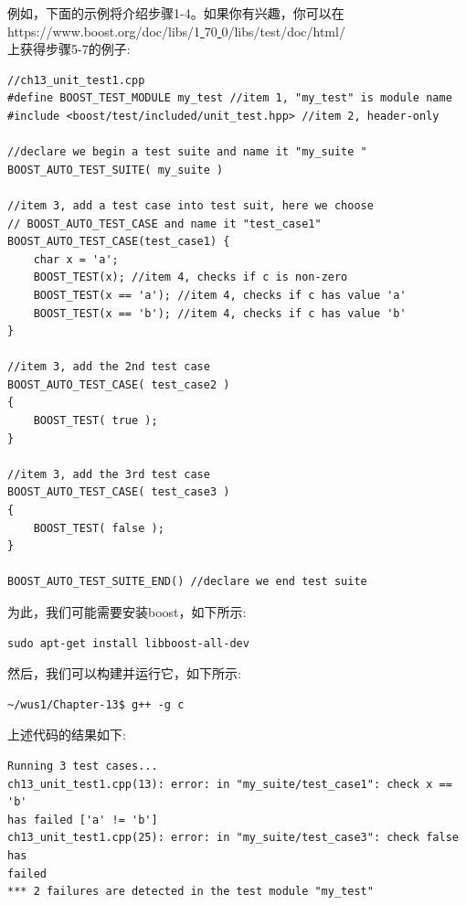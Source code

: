 例如，下面的示例将介绍步骤1-4。如果你有兴趣，你可以在\\https://www.boost.org/doc/libs/1\underline{ }70\underline{ }0/libs/test/doc/html/\\上获得步骤5-7的例子: \par

\begin{lstlisting}[caption={}]
//ch13_unit_test1.cpp
#define BOOST_TEST_MODULE my_test //item 1, "my_test" is module name
#include <boost/test/included/unit_test.hpp> //item 2, header-only

//declare we begin a test suite and name it "my_suite "
BOOST_AUTO_TEST_SUITE( my_suite )

//item 3, add a test case into test suit, here we choose
// BOOST_AUTO_TEST_CASE and name it "test_case1"
BOOST_AUTO_TEST_CASE(test_case1) {
	char x = 'a';
	BOOST_TEST(x); //item 4, checks if c is non-zero
	BOOST_TEST(x == 'a'); //item 4, checks if c has value 'a'
	BOOST_TEST(x == 'b'); //item 4, checks if c has value 'b'
}

//item 3, add the 2nd test case
BOOST_AUTO_TEST_CASE( test_case2 )
{
	BOOST_TEST( true );
}

//item 3, add the 3rd test case
BOOST_AUTO_TEST_CASE( test_case3 )
{
	BOOST_TEST( false );
}

BOOST_AUTO_TEST_SUITE_END() //declare we end test suite
\end{lstlisting}

为此，我们可能需要安装boost，如下所示: \par

\begin{lstlisting}[caption={}]
sudo apt-get install libboost-all-dev
\end{lstlisting}

然后，我们可以构建并运行它，如下所示: \par

\begin{lstlisting}[caption={}]
~/wus1/Chapter-13$ g++ -g c
\end{lstlisting}

上述代码的结果如下: \par

\begin{lstlisting}[caption={}]
Running 3 test cases...
ch13_unit_test1.cpp(13): error: in "my_suite/test_case1": check x == 'b'
has failed ['a' != 'b']
ch13_unit_test1.cpp(25): error: in "my_suite/test_case3": check false has
failed
*** 2 failures are detected in the test module "my_test"
\end{lstlisting}

